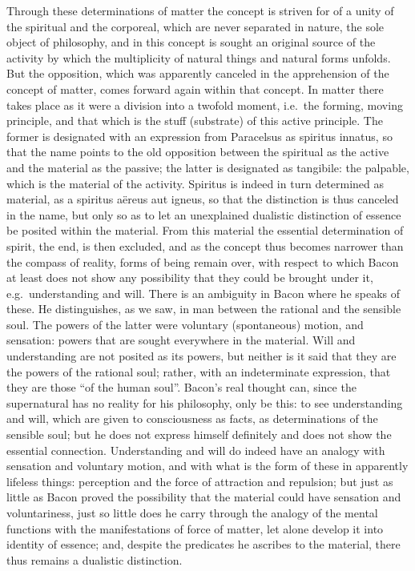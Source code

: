 Through these determinations of matter the concept is striven for of a unity of the spiritual and the corporeal, which are never separated in nature, the sole
object of philosophy, and in this concept is
sought an original source of the activity by which
the multiplicity of natural things and natural forms unfolds.
But the opposition, which was apparently canceled in the apprehension of the concept of matter, comes forward again within that concept.
In matter there takes place as it were a division into a twofold moment, i.e.\ the forming, moving principle, and that which is the stuff (substrate) of this
active principle. The former is designated with an expression from
Paracelsus as spiritus innatus, so that the name points
to the old opposition between the spiritual as the
active and the material as the passive; the latter is designated as
tangibile: the palpable, which is the material of the activity.
Spiritus is indeed in turn determined as material, as a spiritus
aëreus aut igneus, so that the distinction is thus canceled in the name,
but only so as to let an unexplained dualistic distinction of essence
be posited within the material. From this material the essential determination of spirit, the end, is then excluded, and as
the concept thus becomes narrower than the compass of reality,
forms of being remain over, with respect to which Bacon at least does not show any possibility that they could be brought
under it, e.g.\ understanding and will. There is an
ambiguity in Bacon where he speaks of these. He distinguishes, as we saw, in man between the rational and the
sensible soul. The powers of the latter were voluntary (spontaneous)
motion, and sensation: powers that are sought everywhere in the
material. Will and understanding are not posited as its powers,
but neither is it said that they are the powers of the rational soul;
rather, with an indeterminate expression, that they are those
``of the human soul''. Bacon's real thought can, since the
supernatural has no reality for his philosophy, only be
this: to see understanding and will, which are given to consciousness
as facts, as determinations of the sensible soul;
but he does not express himself definitely and does not show the essential connection. Understanding and will do indeed have an analogy
with sensation and voluntary motion, and with what is
the form of these in apparently lifeless things: perception and
the force of attraction and repulsion; but just as little as Bacon
proved the possibility that the material could have sensation and voluntariness, just so little does he carry through the analogy of the
mental functions with the manifestations of force of matter,
let alone develop it into identity of essence; and, despite the predicates he ascribes to the material, there thus remains a dualistic
distinction.

